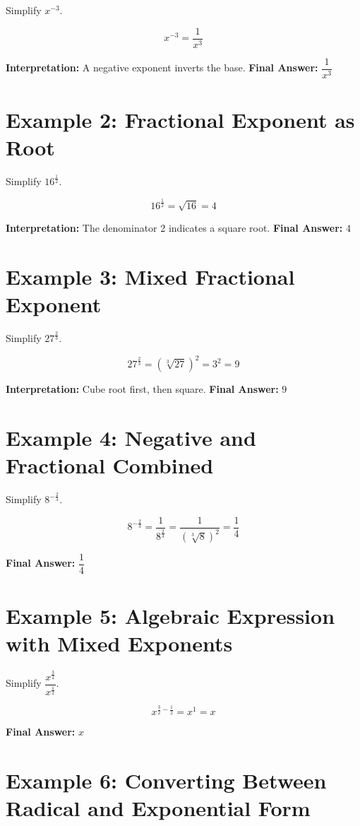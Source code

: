 \documentclass[14pt]{extarticle}
\begin{document}
Simplify \(x^{-3}\).

\[
x^{-3} = \frac{1}{x^3}
\]

\textbf{Interpretation:} A negative exponent inverts the base.  
\textbf{Final Answer:} \(\boxed{\dfrac{1}{x^3}}\)

\section*{Example 2: Fractional Exponent as Root}

Simplify \(16^{\frac{1}{2}}\).

\[
16^{\frac{1}{2}} = \sqrt{16} = 4
\]

\textbf{Interpretation:} The denominator 2 indicates a square root.  
\textbf{Final Answer:} \(\boxed{4}\)

\section*{Example 3: Mixed Fractional Exponent}

Simplify \(27^{\frac{2}{3}}\).

\[
27^{\frac{2}{3}} = (\sqrt[3]{27})^2 = 3^2 = 9
\]

\textbf{Interpretation:} Cube root first, then square.  
\textbf{Final Answer:} \(\boxed{9}\)

\section*{Example 4: Negative and Fractional Combined}

Simplify \(8^{-\frac{2}{3}}\).

\[
8^{-\frac{2}{3}} = \frac{1}{8^{\frac{2}{3}}} = \frac{1}{(\sqrt[3]{8})^2} = \frac{1}{4}
\]

\textbf{Final Answer:} \(\boxed{\dfrac{1}{4}}\)

\section*{Example 5: Algebraic Expression with Mixed Exponents}

Simplify \(\dfrac{x^{\frac{3}{2}}}{x^{\frac{1}{2}}}\).

\[
x^{\frac{3}{2} - \frac{1}{2}} = x^{1} = x
\]

\textbf{Final Answer:} \(\boxed{x}\)

\section*{Example 6: Converting Between Radical and Exponential Form}
\end{document}
